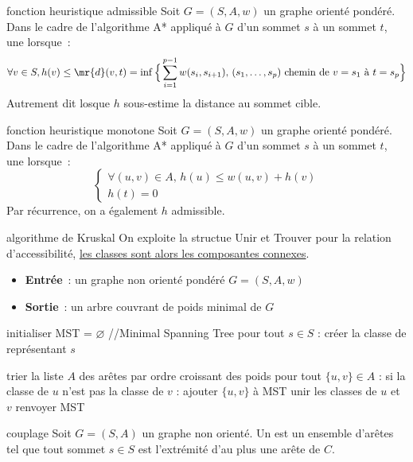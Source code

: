 \begin{adjustwidth}{-3cm}{-3cm}
\begin{definition}{3.4}{fonction heuristique admissible}
    Soit $G = (S,A,w)$ un graphe orienté pondéré. Dans le cadre de l'algorithme A* appliqué à $G$ d'un sommet $s$ à un sommet $t$, une  lorsque~:
    $$\forall v \in S, h(v) \leq \mr{d}(v,t) = \inf\Big\{\sum_{i=1}^{p-1} w(s_i, s_{i+1}),\, (s_1, \dots, s_p) \text{ chemin de }v=s_1 \text{ à } t = s_p\Big\}$$
    Autrement dit losque $h$ sous-estime la distance au sommet cible.
\end{definition}

\begin{definition}{3.5}{fonction heuristique monotone}
    Soit $G = (S,A,w)$ un graphe orienté pondéré. Dans le cadre de l'algorithme A* appliqué à $G$ d'un sommet $s$ à un sommet $t$, une  lorsque~:
    $$\begin{cases*}
    \forall (u,v) \in A,\, h(u) \leq w(u,v) + h(v) \\
    h(t) = 0
    \end{cases*}$$
    Par récurrence, on a également $h$ admissible.
\end{definition}

\begin{implementation}{algorithme de Kruskal}
    On exploite la structue Unir et Trouver pour la relation d'accessibilité, \underline{les classes sont alors les composantes connexes}.
    \begin{itemize}
        \item \textbf{Entrée}~: un graphe non orienté pondéré $G = (S,A,w)$
        \item \textbf{Sortie}~: un arbre couvrant de poids minimal de $G$
    \end{itemize}
    \begin{lstLNat}
    initialiser MST = $\varnothing$ //Minimal Spanning Tree
    pour tout $s \in S$ :
        créer la classe de représentant $s$
        
    trier la liste $A$ des arêtes par ordre croissant des poids
    pour tout $\{u,v\} \in A$ :
        si la classe de $u$ n'est pas la classe de $v$ :
            ajouter $\{u,v\}$ à MST
            unir les classes de $u$ et $v$
    renvoyer MST
    \end{lstLNat}
\end{implementation}


\begin{definition}{3.20}{couplage}
    Soit $G = (S,A)$ un graphe non orienté. Un  est un ensemble d'arêtes tel que tout sommet $s \in S$ est l'extrémité d'au plus une arête de $C$.
\end{definition}


\end{adjustwidth}

